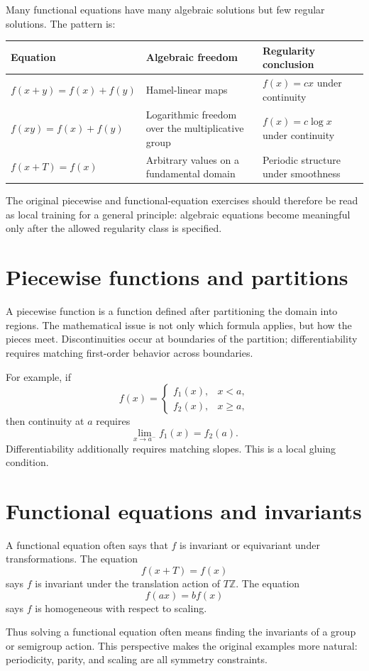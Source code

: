 Many functional equations have many algebraic solutions but few regular solutions.  The pattern is:

\begin{center}
\small
\begin{tabularx}{\textwidth}{@{}lYY@{}}
\toprule
Equation & Algebraic freedom & Regularity conclusion \\
\midrule
$f(x+y)=f(x)+f(y)$ & Hamel-linear maps & $f(x)=cx$ under continuity \\
$f(xy)=f(x)+f(y)$ & Logarithmic freedom over the multiplicative group & $f(x)=c\log x$ under continuity \\
$f(x+T)=f(x)$ & Arbitrary values on a fundamental domain & Periodic structure under smoothness \\
\bottomrule
\end{tabularx}
\end{center}

The original piecewise and functional-equation exercises should therefore be read as local training for a general principle: algebraic equations become meaningful only after the allowed regularity class is specified.

\section{Piecewise functions and partitions}

A piecewise function is a function defined after partitioning the domain into regions.  The mathematical issue is not only which formula applies, but how the pieces meet.  Discontinuities occur at boundaries of the partition; differentiability requires matching first-order behavior across boundaries.

For example, if
\[
  f(x)=\begin{cases}f_1(x),&x<a,\\ f_2(x),&x\ge a,
  \end{cases}
\]
then continuity at $a$ requires
\[
  \lim_{x\to a^-}f_1(x)=f_2(a).
\]
Differentiability additionally requires matching slopes.  This is a local gluing condition.

\section{Functional equations and invariants}

A functional equation often says that $f$ is invariant or equivariant under transformations.  The equation
\[
  f(x+T)=f(x)
\]
says $f$ is invariant under the translation action of $T\mathbb Z$.  The equation
\[
  f(ax)=bf(x)
\]
says $f$ is homogeneous with respect to scaling.

Thus solving a functional equation often means finding the invariants of a group or semigroup action.  This perspective makes the original examples more natural: periodicity, parity, and scaling are all symmetry constraints.
